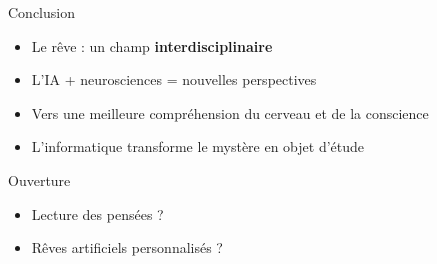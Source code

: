 \documentclass[aspectratio=169]{beamer}
\begin{document}
\begin{frame}{Conclusion}\label{conclusion}

\begin{itemize}
  \item Le rêve : un champ \textbf{interdisciplinaire}
  
  \vspace{0.3cm}
  
  \item L'IA + neurosciences = nouvelles perspectives
  
  \vspace{0.3cm}
  
  \item Vers une meilleure compréhension du cerveau et de la conscience
  
  \vspace{0.3cm}
  
  \item L'informatique transforme le mystère en objet d'étude
\end{itemize}

\vspace{0.8cm}

\begin{block}{Ouverture}
\begin{itemize}
  \item Lecture des pensées ?
  \item Rêves artificiels personnalisés ?
\end{itemize}
\end{block}

\end{frame}
\end{document}
